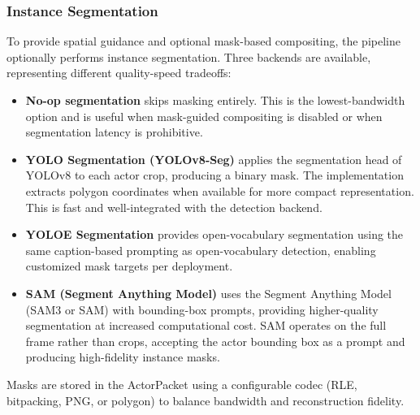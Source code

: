 \documentclass[manuscript, screen]{acmart}
\begin{document}
\subsubsection{Instance Segmentation}
To provide spatial guidance and optional mask-based compositing, the pipeline optionally performs instance segmentation. Three backends are available, representing different quality-speed tradeoffs:
\begin{itemize}[topsep=0pt,itemsep=0pt,leftmargin=*]
    \item \textbf{No-op segmentation} skips masking entirely. This is the lowest-bandwidth option and is useful when mask-guided compositing is disabled or when segmentation latency is prohibitive.
    \item \textbf{YOLO Segmentation (YOLOv8-Seg)} applies the segmentation head of YOLOv8 to each actor crop, producing a binary mask. The implementation extracts polygon coordinates when available for more compact representation. This is fast and well-integrated with the detection backend.
    \item \textbf{YOLOE Segmentation} provides open-vocabulary segmentation using the same caption-based prompting as open-vocabulary detection, enabling customized mask targets per deployment.
    \item \textbf{SAM (Segment Anything Model)} uses the Segment Anything Model (SAM3 or SAM) with bounding-box prompts, providing higher-quality segmentation at increased computational cost. SAM operates on the full frame rather than crops, accepting the actor bounding box as a prompt and producing high-fidelity instance masks.
\end{itemize}
Masks are stored in the ActorPacket using a configurable codec (RLE, bitpacking, PNG, or polygon) to balance bandwidth and reconstruction fidelity.
\end{document}
